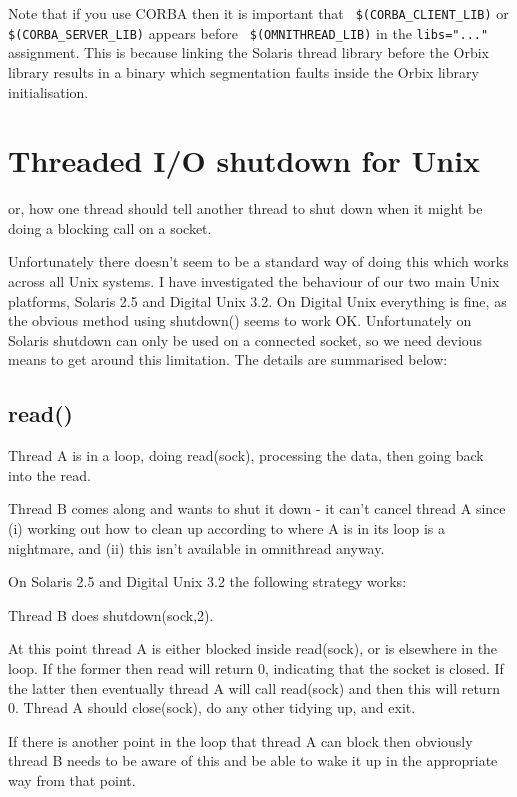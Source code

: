 \documentclass[11pt]{article}
\begin{document}
Note that if you use CORBA then it is important that {\tt
\$(CORBA\_CLIENT\_LIB)} or {\tt \$(CORBA\_SERVER\_LIB)} appears before {\tt
\$(OMNITHREAD\_LIB)} in the {\tt libs="..."} assignment.  This is because
linking the Solaris thread library before the Orbix library results in a binary
which segmentation faults inside the Orbix library initialisation.



\section{Threaded I/O shutdown for Unix}

or, how one thread should tell another thread to shut down when it might
be doing a blocking call on a socket.

Unfortunately there doesn't seem to be a standard way of doing this which works
across all Unix systems.  I have investigated the behaviour of our two main
Unix platforms, Solaris 2.5 and Digital Unix 3.2.  On Digital Unix everything
is fine, as the obvious method using shutdown() seems to work OK.
Unfortunately on Solaris shutdown can only be used on a connected socket, so we
need devious means to get around this limitation.  The details are summarised
below:


\subsection{read()}

Thread A is in a loop, doing read(sock), processing the data, then going back
into the read.

Thread B comes along and wants to shut it down - it can't cancel thread A since
(i) working out how to clean up according to where A is in its loop is a
nightmare, and (ii) this isn't available in omnithread anyway.

On Solaris 2.5 and Digital Unix 3.2 the following strategy works:

Thread B does shutdown(sock,2).

At this point thread A is either blocked inside read(sock), or is elsewhere in
the loop.  If the former then read will return 0, indicating that the socket is
closed.  If the latter then eventually thread A will call read(sock) and then
this will return 0.  Thread A should close(sock), do any other tidying up, and
exit.

If there is another point in the loop that thread A can block then obviously
thread B needs to be aware of this and be able to wake it up in the appropriate
way from that point.
\end{document}
